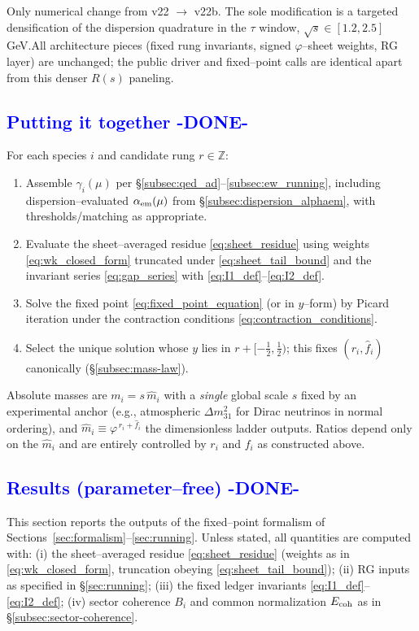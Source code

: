 \documentclass[%
 amsmath,amssymb,
 aps,
prb,
floatfix, showkeys
]{revtex4-2}
\newcommand{\modif}[1]{\textcolor{blue}{#1}}
\begin{document}
Only numerical change from v22 $\to$ v22b. The sole modification is a targeted densification of the dispersion quadrature in the $\tau$ window, $\sqrt{s}\!\in[1.2,2.5]$\,GeV.\;All architecture pieces (fixed rung invariants, signed $\varphi$--sheet weights, RG layer) are unchanged; the public driver and fixed--point calls are identical apart from this denser $R(s)$ paneling.








{\modif{
\subsection{Putting it together -DONE- }
\label{subsec:together}
}}
For each species $i$ and candidate rung $r\in\mathbb{Z}$:
\begin{enumerate}
  \item Assemble $\gamma_i(\mu)$ per \S\ref{subsec:qed_ad}–\ref{subsec:ew_running}, including dispersion–evaluated $\alpha_{\rm em}(\mu)$ from \S\ref{subsec:dispersion_alphaem}, with thresholds/matching as appropriate.
  \item Evaluate the sheet–averaged residue \eqref{eq:sheet_residue} using weights \eqref{eq:wk_closed_form} truncated under \eqref{eq:sheet_tail_bound} and the invariant series \eqref{eq:gap_series} with \eqref{eq:I1_def}–\eqref{eq:I2_def}.
  \item Solve the fixed point \eqref{eq:fixed_point_equation} (or in $y$–form) by Picard iteration under the contraction conditions \eqref{eq:contraction_conditions}.
  \item Select the unique solution whose $y$ lies in $r+[-\tfrac{1}{2},\tfrac{1}{2})$; this fixes $(r_i,\widehat f_i)$ canonically (\S\ref{subsec:mass-law}).
\end{enumerate}
Absolute masses are $m_i = s\,\widehat m_i$ with a \emph{single} global scale $s$ fixed by an experimental anchor (e.g., atmospheric $\Delta m^2_{31}$ for Dirac neutrinos in normal ordering), and $\widehat m_i\equiv \varphi^{\,r_i+\widehat f_i}$ the dimensionless ladder outputs. Ratios depend only on the $\widehat m_i$ and are entirely controlled by $r_i$ and $f_i$ as constructed above.







{\modif{
    \section{Results (parameter--free)   -DONE-}
\label{sec:results}
}}
This section reports the outputs of the fixed--point formalism of Sections~\ref{sec:formalism}–\ref{sec:running}. Unless stated, all quantities are computed with:
(i) the sheet--averaged residue \eqref{eq:sheet_residue} (weights as in \eqref{eq:wk_closed_form}, truncation obeying \eqref{eq:sheet_tail_bound});
(ii) RG inputs as specified in \S\ref{sec:running};
(iii) the fixed ledger invariants \eqref{eq:I1_def}–\eqref{eq:I2_def};
(iv) sector coherence $B_i$ and common normalization $E_{\rm coh}$ as in \S\ref{subsec:sector-coherence}.
\end{document}
